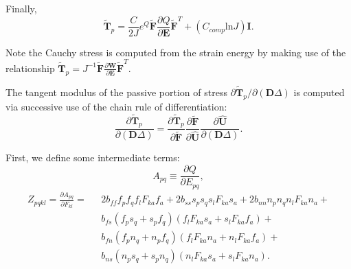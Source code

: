 Finally,
\begin{equation}
\tilde{\bm{T}}_p = \frac{C}{2J}e^{Q}\tilde{\bm{F}}\frac{\partial{Q}}{\partial{\bm{E}}}\tilde{\bm{F}}^T + (C_{comp}\text{ln}J)\bm{I}.
\end{equation}

Note the Cauchy stress is computed from the strain energy by making use of the relationship $\tilde{\bm{T}}_p = J^{-1}\tilde{\bm{F}}\frac{\partial\bm{W}}{\partial \bm{E}} \tilde{\bm{F}}^T$. 

The tangent modulus of the passive portion of stress ${\partial \tilde{\bm{T}}_p}/{\partial (\bm{D}\Delta)}$ is computed via successive use of the chain rule of differentiation:
\begin{equation}
\frac{\partial \tilde{\bm{T}}_p}{\partial (\bm{D}\Delta)} = \frac{\partial \tilde{\bm{T}}_p}{\partial \tilde{\bm{F}}}\frac{\partial \tilde{\bm{F}}}{\partial \hat{\bm{U}}}\frac{\partial \hat{\bm{U}}}{\partial (\bm{D}\Delta)}.
\label{eqn:tanmod}
\end{equation}

First, we define some intermediate terms:
\begin{equation}
A_{pq} \equiv \frac{\partial Q}{\partial E_{pq}},
\end{equation}
\begin{equation}
\begin{aligned}
Z_{pqkl} = \frac{\partial A_{pq}}{\partial F_{kl}} = \text{\ } &2b_{ff}f_pf_qf_lF_{ka}f_a + 2b_{ss}s_ps_qs_lF_{ka}s_a + 2b_{nn}n_pn_qn_lF_{ka}n_a +\\
& b_{fs}\left(f_ps_q + s_pf_q\right)\left(f_lF_{ka}s_a + s_lF_{ka}f_a\right) +\\
& b_{fn}\left(f_pn_q + n_pf_q\right)\left(f_lF_{ka}n_a + n_lF_{ka}f_a\right) +\\
& b_{ns}\left(n_ps_q + s_pn_q\right)\left(n_lF_{ka}s_a + s_lF_{ka}n_a\right).
\end{aligned}
\end{equation}

